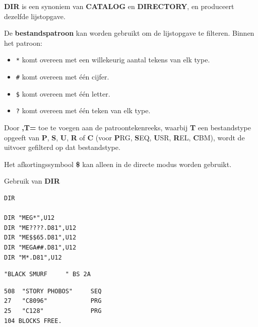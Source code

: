 \begin{description}[leftmargin=2cm,style=nextline]
                  \unitdefinition

\item [Opmerkingen:]  {\bf DIR} is een synoniem van {\bf CATALOG} en {\bf DIRECTORY}, en produceert dezelfde lijstopgave.

                  De {\bf bestandspatroon} kan worden gebruikt om de lijstopgave te filteren. Binnen het patroon:
                  \begin{itemize}
                     \item \texttt{*} komt overeen met een willekeurig aantal tekens van elk type.                     \item \texttt{\#} komt overeen met één cijfer.                     \item \texttt{\$} komt overeen met één letter.                     \item \texttt{?} komt overeen met één teken van elk type.
                  \end{itemize}

                  Door {\bf ,T=} toe te voegen aan de patroontekenreeks, waarbij {\bf T} een bestandstype opgeeft van {\bf P}, {\bf S}, {\bf U}, {\bf R} of {\bf C} (voor {\bf P}RG, {\bf S}EQ, {\bf U}SR, {\bf R}EL, {\bf C}BM), wordt de uitvoer gefilterd op dat bestandstype.

Het afkortingssymbool {\bf \$} kan alleen in de directe modus worden gebruikt.

\item [Voorbeeld:]  Gebruik van {\bf DIR}

\begin{tcolorbox}[colback=black,coltext=white]
\verbatimfont{\codefont}
\begin{verbatim}
DIR

DIR "MEG*",U12
DIR "ME????.D81",U12
DIR "ME$$65.D81",U12
DIR "MEGA##.D81",U12
DIR "M*.D81",U12
\end{verbatim}

\selectfont{\codefont 0}
\begin{tcolorbox}[colback=white,coltext=black,arc=0mm,boxrule=0mm,
       left*=0.5mm,right*=0mm,top=0mm,bottom=0mm,nobeforeafter,       left skip=0.5mm,       width=28mm,height=3mm,valign=center]
\begin{verbatim}
"BLACK SMURF     " BS 2A
\end{verbatim}
\end{tcolorbox}
\begin{verbatim}
508  "STORY PHOBOS"     SEQ
27   "C8096"            PRG
25   "C128"             PRG
104 BLOCKS FREE.
\end{verbatim}
\end{tcolorbox}
\end{description}

